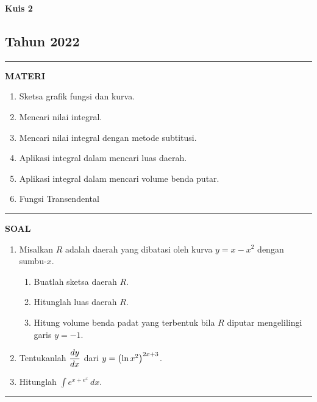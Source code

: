 \begin{flushright}
    \textbf{\Large{Kuis 2}}
    \subsection*{Tahun 2022}
\end{flushright}
\vspace{0.5cm}
\hrule height 2pt
\vspace{0.5cm}
\begin{center}
    \textbf{\large{MATERI}}
    \begin{enumerate}[leftmargin=*, label={\arabic*}.]
        \item Sketsa grafik fungsi dan kurva.
        \item Mencari nilai integral.
        \item Mencari nilai integral dengan metode subtitusi.
        \item Aplikasi integral dalam mencari luas daerah.
        \item Aplikasi integral dalam mencari volume benda putar.
        \item Fungsi Transendental
    \end{enumerate}
\end{center}
\vspace{0.2cm}
\hrule height 1pt
\vspace{0.5cm}
\begin{center}
    \textbf{\large{SOAL}}
\end{center}
\begin{enumerate}[leftmargin=*, label={\arabic*}.]
\item Misalkan $R$ adalah daerah yang dibatasi oleh kurva $y=x-x^{2}$ 
dengan sumbu-$x$.
\begin{enumerate}[label={\alph*}.]
    \item Buatlah sketsa daerah $R$.
    \item Hitunglah luas daerah $R$.
    \item Hitung volume benda padat yang terbentuk bila $R$ diputar 
    mengelilingi garis $y=-1$.
\end{enumerate}
\item Tentukanlah $\ds \frac{dy}{dx}$ dari $y=\brk*{\ln x^{2}}^{2x+3}$.
\item Hitunglah $\int e^{x+e^{x}}\,dx$.
\end{enumerate}
\vspace{0.2cm}
\hrule height 1pt
\vspace{0.5cm}

